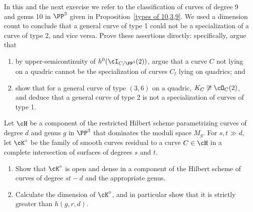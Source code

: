 \begin{exercise}
 In this and the next exercise we refer to the classification of curves of degree 9 and genus 10 in $\PP^3$ given in Proposition~\ref{types of 10,3,9}. We used a dimension count to conclude that a general curve of type 1 could not be a specialization of a curve of type 2, and vice versa. Prove these assertions directly: specifically, argue that
\begin{enumerate}
\item by upper-semicontinuity of $h^0(\cI_{C/\PP^3}(2))$, argue that a curve $C$ not lying on a quadric cannot be the specialization of curves $C_t$ lying on quadrics; and
\item show that for a general curve of type $(3,6)$ on a quadric, $K_C \not\cong \cO_C(2)$, and deduce that a general curve of type 2 is not a specialization of curves of type 1.
\end{enumerate}
\end{exercise}



\begin{exercise}\label{many large components}
Let $\cH$ be a component of the restricted Hilbert scheme parametrizing curves of degree $d$ and genus $g$ in $\PP^3$ that dominates the moduli space $M_g$. For $s, t \gg d$, let $\cK^\circ$ be the family of smooth curves residual to a curve $C \in  \cH$ in a complete intersection of surfaces of degrees $s$ and $t$.
\begin{enumerate}
\item Show that $\cK^\circ$ is open and dense in a component of the Hilbert scheme of curves of degree $st-d$ and the appropriate genus.
\item Calculate the dimension of $\cK^\circ$, and in particular show that it is strictly greater than $h(g,r,d)$.
\end{enumerate}
\end{exercise}

